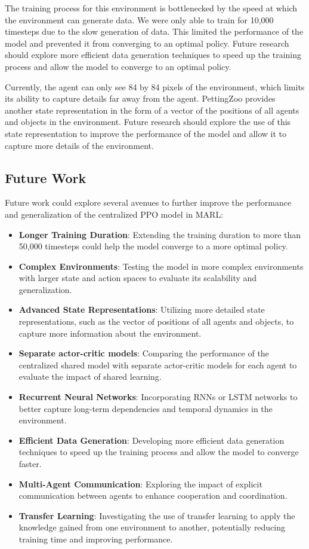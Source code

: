 \documentclass{article}
\begin{document}
The training process for this environment is bottlenecked by the speed at which the environment can generate data.
We were only able to train for 10,000 timesteps due to the slow generation of data. This limited the performance of the model
and prevented it from converging to an optimal policy. Future research should explore more efficient data generation techniques
to speed up the training process and allow the model to converge to an optimal policy.

Currently, the agent can only see 84 by 84 pixels of the environment, which limits 
its ability to capture details far away from the agent. PettingZoo provides another 
state representation
in the form of a vector of the positions of all agents and objects in the environment. 
Future research should explore the use of this state representation to improve 
the performance of the model and 
allow it to capture more details of the environment.

\subsection{Future Work}
Future work could explore several avenues to further improve the performance and generalization of the centralized PPO model in MARL:

\begin{itemize}
  \item \textbf{Longer Training Duration}: Extending the training duration to more than 50,000 timesteps could help the model converge to a more optimal policy.
  \item \textbf{Complex Environments}: Testing the model in more complex environments with larger state and action spaces to evaluate its scalability and generalization.
  \item \textbf{Advanced State Representations}: Utilizing more detailed state representations, such as the vector of positions of all agents and objects, to capture more information about the environment.
  \item \textbf{Separate actor-critic models}: Comparing the performance of the centralized shared model with separate actor-critic models for each agent to evaluate the impact of shared learning.
  \item \textbf{Recurrent Neural Networks}: Incorporating RNNs or LSTM networks to better capture long-term dependencies and temporal dynamics in the environment.
  \item \textbf{Efficient Data Generation}: Developing more efficient data generation techniques to speed up the training process and allow the model to converge faster.
  \item \textbf{Multi-Agent Communication}: Exploring the impact of explicit communication between agents to enhance cooperation and coordination.
  \item \textbf{Transfer Learning}: Investigating the use of transfer learning to apply the knowledge gained from one environment to another, potentially reducing training time and improving performance.
\end{itemize}
\end{document}
